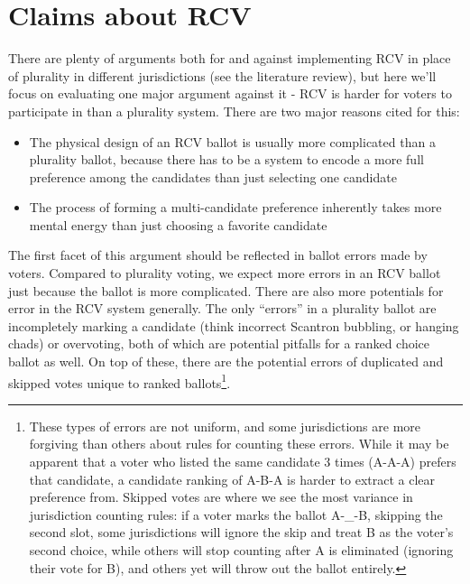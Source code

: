 \documentclass[12pt,twoside]{reedthesis}
\begin{document}
\hypertarget{claims-about-rcv}{%
\section{Claims about RCV}\label{claims-about-rcv}}

There are plenty of arguments both for and against implementing RCV in place of plurality in different jurisdictions (see the literature review), but here we'll focus on evaluating one major argument against it - RCV is harder for voters to participate in than a plurality system. There are two major reasons cited for this:
\begin{itemize}
\item
  The physical design of an RCV ballot is usually more complicated than a plurality ballot, because there has to be a system to encode a more full preference among the candidates than just selecting one candidate
\item
  The process of forming a multi-candidate preference inherently takes more mental energy than just choosing a favorite candidate
\end{itemize}
The first facet of this argument should be reflected in ballot errors made by voters. Compared to plurality voting, we expect more errors in an RCV ballot just because the ballot is more complicated. There are also more potentials for error in the RCV system generally. The only ``errors'' in a plurality ballot are incompletely marking a candidate (think incorrect Scantron bubbling, or hanging chads) or overvoting, both of which are potential pitfalls for a ranked choice ballot as well. On top of these, there are the potential errors of duplicated and skipped votes unique to ranked ballots\footnote{These types of errors are not uniform, and some jurisdictions are more forgiving than others about rules for counting these errors. While it may be apparent that a voter who listed the same candidate 3 times (A-A-A) prefers that candidate, a candidate ranking of A-B-A is harder to extract a clear preference from. Skipped votes are where we see the most variance in jurisdiction counting rules: if a voter marks the ballot A-\_-B, skipping the second slot, some jurisdictions will ignore the skip and treat B as the voter's second choice, while others will stop counting after A is eliminated (ignoring their vote for B), and others yet will throw out the ballot entirely.}.
\end{document}
